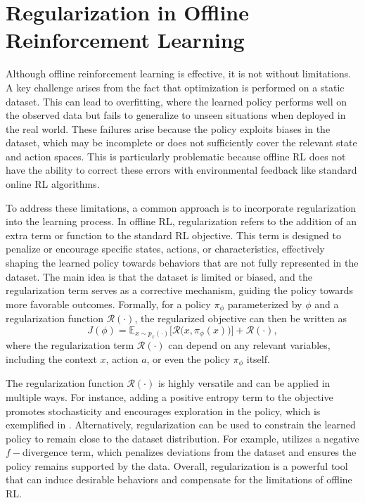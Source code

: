 \documentclass[./dissertation.tex]{subfiles}
\begin{document}
\section{Regularization in Offline Reinforcement Learning}
\label{Reg}
Although offline reinforcement learning is effective, it is not without limitations. A key challenge arises from the fact that optimization is performed on a static dataset. This can lead to overfitting, where the learned policy performs well on the observed data but fails to generalize to unseen situations when deployed in the real world. These failures arise because the policy exploits biases in the dataset, which may be incomplete or does not sufficiently cover the relevant state and action spaces. This is particularly problematic because offline RL does not have the ability to correct these errors with environmental feedback like standard online RL algorithms.

To address these limitations, a common approach is to incorporate regularization into the learning process. In offline RL, regularization refers to the addition of an extra term or function to the standard RL objective. This term is designed to penalize or encourage specific states, actions, or characteristics, effectively shaping the learned policy towards behaviors that are not fully represented in the dataset. The main idea is that the dataset is limited or biased, and the regularization term serves as a corrective mechanism, guiding the policy towards more favorable outcomes. Formally, for a policy $\pi_\phi$ parameterized by $\phi$ and a regularization function $\mathscr{R}(\cdot)$, the regularized objective can then be written as
\begin{equation}
J(\phi) = 
\mathbb{E}_{x \sim p_x(\cdot)}
\Big[\mathcal{R} \big( x, \pi_\phi (x) \big) \Big] + \mathscr{R}(\cdot),
\label{Regularized Objective}
\end{equation}
where the regularization term $\mathscr{R}(\cdot)$ can depend on any relevant variables, including the context $x$, action $a$, or even the policy $\pi_\phi$ itself. 

The regularization function $\mathscr{R}(\cdot)$ is highly versatile and can be applied in multiple ways. For instance, adding a positive entropy term to the objective promotes stochasticity and encourages exploration in the policy, which is exemplified in \cite{SAC}. Alternatively, regularization can be used to constrain the learned policy to remain close to the dataset distribution. 
For example, \cite{f-Divergence} utilizes a negative $f-$divergence term, which penalizes deviations from the dataset and ensures the policy remains supported by the data. Overall, regularization is a powerful tool that can induce desirable behaviors and compensate for the limitations of offline RL.
\end{document}
